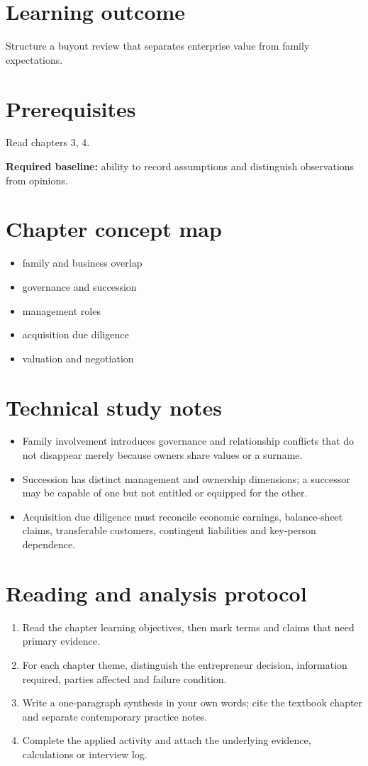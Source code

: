 \documentclass[11pt,letterpaper]{article}
\begin{document}
\SuiteOpen
\section{Learning outcome}
Structure a buyout review that separates enterprise value from family expectations.
\section{Prerequisites}
Read chapters 3, 4.\par\textbf{Required baseline:} ability to record assumptions and distinguish observations from opinions.
\section{Chapter concept map}
\begin{itemize}[leftmargin=*,itemsep=3pt]
\item family and business overlap
\item governance and succession
\item management roles
\item acquisition due diligence
\item valuation and negotiation
\end{itemize}

\section{Technical study notes}
\begin{itemize}[leftmargin=*,itemsep=3pt]
\item Family involvement introduces governance and relationship conflicts that do not disappear merely because owners share values or a surname.
\item Succession has distinct management and ownership dimensions; a successor may be capable of one but not entitled or equipped for the other.
\item Acquisition due diligence must reconcile economic earnings, balance-sheet claims, transferable customers, contingent liabilities and key-person dependence.
\end{itemize}

\section{Reading and analysis protocol}
\begin{enumerate}[leftmargin=*,itemsep=5pt]
\item Read the chapter learning objectives, then mark terms and claims that need primary evidence.
\item For each chapter theme, distinguish the entrepreneur decision, information required, parties affected and failure condition.
\item Write a one-paragraph synthesis in your own words; cite the textbook chapter and separate contemporary practice notes.
\item Complete the applied activity and attach the underlying evidence, calculations or interview log.
\end{enumerate}
\end{document}
